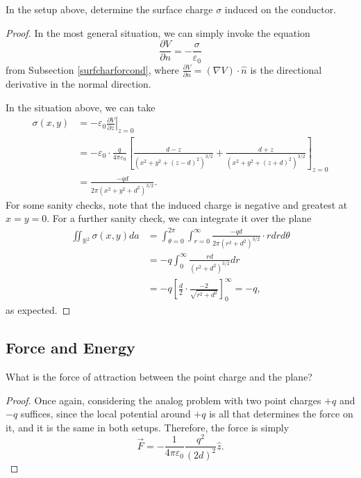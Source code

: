 \begin{example}
In the setup above, determine the surface charge $\sigma$ induced on the conductor.
\end{example}

\begin{proof}
In the most general situation, we can simply invoke the equation
\[\frac{\partial V}{\partial n}=-\frac{\sigma}{\varepsilon_0}\]
from Subsection \ref{surfcharforcond}, where $\frac{\partial V}{\partial n}=(\nabla V)\cdot\hat{n}$ is the directional derivative in the normal direction.

In the situation above, we can take
\begin{align*}
\sigma(x,y)&=-\varepsilon_0\left.\frac{\partial V}{\partial z}\right\rvert_{z=0}\\
&=-\varepsilon_0\cdot \frac{q}{4\pi\varepsilon_0}\left[\frac{d-z}{(x^2+y^2+(z-d)^2)^{3/2}}+\frac{d+z}{(x^2+y^2+(z+d)^2)^{3/2}}\right]_{z=0}\\
&=\boxed{\frac{-qd}{2\pi(x^2+y^2+d^2)^{3/2}}}.
\end{align*}
For some sanity checks, note that the induced charge is negative and greatest at $x=y=0$. For a further sanity check, we can integrate it over the plane
\begin{align*}
    \iint_{\mathbb{R}^2}\sigma(x,y)da&=\int_{\theta=0}^{2\pi}\int_{r=0}^\infty \frac{-qd}{2\pi(r^2+d^2)^{3/2}}\cdot rdrd\theta\\
    &=-q\int_{0}^\infty\frac{rd}{(r^2+d^2)^{3/2}}dr\\
    &=-q\left[\frac{d}{2}\cdot \frac{-2}{\sqrt{r^2+d^2}}\right]_0^\infty=-q,
\end{align*}
as expected.

\end{proof}

\subsection{Force and Energy}

\begin{example}
What is the force of attraction between the point charge and the plane?
\end{example}

\begin{proof}
Once again, considering the analog problem with two point charges $+q$ and $-q$ suffices, since the local potential around $+q$ is all that determines the force on it, and it is the same in both setups. Therefore, the force is simply
\[\vec{F}=-\frac{1}{4\pi\varepsilon_0}\frac{q^2}{(2d)^2}\hat{z}.\]
\end{proof}

